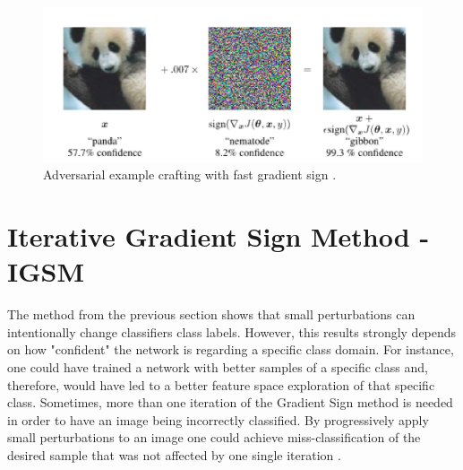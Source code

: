 \begin{figure}[!h]
\centering
	\includegraphics[scale=0.6]{panda.png}
\caption{Adversarial example crafting with fast gradient sign \cite{goodfellow2014}.}
\label{fig:fgsm_craft}
\end{figure}

\section{Iterative Gradient Sign Method - IGSM}

The method from the previous section shows that small perturbations can intentionally change classifiers class labels. However, this results strongly depends on how "confident" the network is regarding a specific class domain. For instance, one could have trained a network with better samples of a specific class and, therefore, would have led to a better feature space exploration of that specific class. Sometimes, more than one iteration of the Gradient Sign method is needed in order to have an image being incorrectly classified. By progressively apply small perturbations to an image one could achieve miss-classification of the desired sample that was not affected by one single iteration \cite{goodfellow2016}. 

